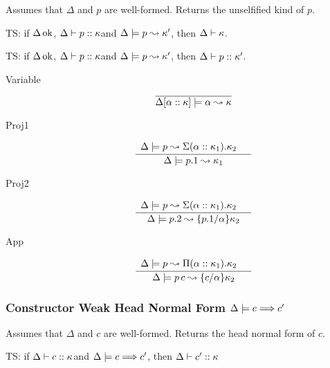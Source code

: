 \documentclass[12pt,twoside,fleqn]{amsart}
\theoremstyle{plain}
\theoremstyle{plain}
\theoremstyle{definition}
\begin{document}
Assumes that \( \Delta  \) and \( p \) are well-formed. Returns the unselfified
kind of \( p \). 

TS: if \( \Delta  \, \mathrm{ok} \), \( \Delta  \vdash p  ::\kappa   \)and \( \Delta  \models p  \leadsto \kappa '  \),
then \( \Delta  \vdash \kappa   \).

TS: if \( \Delta  \, \mathrm{ok} \), \( \Delta  \vdash p  ::\kappa   \)and \( \Delta  \models p  \leadsto \kappa '  \),
then \( \Delta  \vdash p  ::\kappa '  \).

\begin{description}
\item [Variable]
\[
\overline{\Delta  [\alpha   ::\kappa   ] \models \alpha  \leadsto \kappa  }\]

\item [Proj1]
\[
\frac{\begin{array}{ll}
\Delta  \models p  \leadsto \Sigma (\alpha ::\kappa _{1}).\kappa _{2}  & 
\end{array} }{\Delta  \models p.1  \leadsto \kappa _{1}  }\]

\item [Proj2]
\[
\frac{\begin{array}{ll}
\Delta  \models p  \leadsto \Sigma (\alpha ::\kappa _{1}).\kappa _{2}  & 
\end{array} }{\Delta  \models p.2  \leadsto \{p.1 /\alpha  \}\kappa _{2}  }\]

\item [App]
\[
\frac{\begin{array}{ll}
\Delta  \models p  \leadsto \Pi (\alpha ::\kappa _{1}).\kappa _{2}  & 
\end{array} }{\Delta  \models p\, c  \leadsto \{c /\alpha  \}\kappa _{2}  }\]

\end{description}

\subsubsection{Constructor Weak Head Normal Form \protect\( \Delta  \models c \Longrightarrow c'\protect \)}

Assumes that \( \Delta  \) and \( c \) are well-formed. Returns the head normal
form of \( c \). 

TS: if \( \Delta  \vdash c  ::\kappa   \)and \( \Delta  \models c \Longrightarrow c' \), then \( \Delta  \vdash c'  ::\kappa   \)
\end{document}
